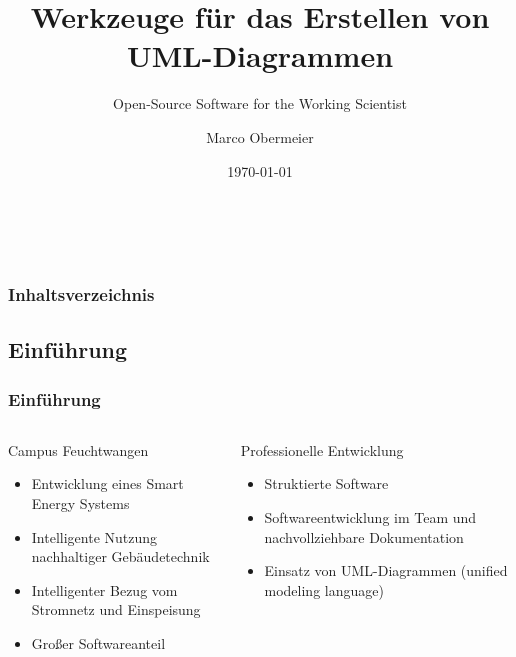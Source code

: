 \documentclass[xcolor=dvipsnames]{beamer}
\title{Werkzeuge für das Erstellen von UML-Diagrammen}
\subtitle{Open-Source Software for the Working Scientist \\}
\institute{Master of Applied Research\\ Hochschule Ansbach\\}
\author{Marco Obermeier}
\date{\today}
\begin{document}
 
	\begin{frame}
		\frametitle{~}
		\maketitle 
	\end{frame}
	\begin{frame}
		\frametitle{Inhaltsverzeichnis}
		\tableofcontents
	\end{frame}
	
	
	\small
	\begin{frame}
		\section{Einführung}
		\frametitle{Einführung}
		\begin{columns}
			\begin{column}{0.50\textwidth}
				\begin{block}{Campus Feuchtwangen}
					\begin{itemize}
						\item Entwicklung eines Smart Energy Systems
						\item Intelligente Nutzung nachhaltiger Gebäudetechnik
						\item Intelligenter Bezug vom Stromnetz und Einspeisung
						\item Großer Softwareanteil
					\end{itemize}
				\end{block}
			\end{column}
			
			\begin{column}{0.50\textwidth}
				\begin{block}{Professionelle Entwicklung}
					\begin{itemize}
						\item Struktierte Software
						\item Softwareentwicklung im Team und nachvollziehbare Dokumentation
						\item Einsatz von UML-Diagrammen (unified modeling language)
					\end{itemize}
				\end{block}
			\end{column}
		\end{columns}
		
	\end{frame}
	
\end{document}
